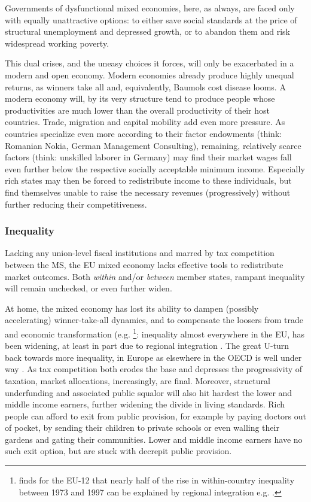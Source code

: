\documentclass[11pt,a4paper,oneside,openright]{article}
\begin{document}
Governments of dysfunctional mixed economies, here, as always, are faced only with equally unattractive options: 
to either save social standards at the price of structural unemployment and depressed growth, or to abandon them and risk widespread working poverty.

This dual crises, and the uneasy choices it forces, will only be exacerbated in a modern and open economy. 
Modern economies already produce highly unequal returns, as winners take all and, equivalently, Baumols cost disease looms. 
A modern economy will, by its very structure tend to produce people whose productivities are much lower than the overall productivity of their host countries. 
Trade, migration and capital mobility add even more pressure. 
As countries specialize even more according to their factor endowments (think: Romanian Nokia, German Management Consulting), remaining, relatively scarce factors (think: unskilled laborer in Germany) may find their market wages fall even further below the respective socially acceptable minimum income. 
Especially rich states may then be forced to redistribute income to these individuals, but find themselves unable to raise the necessary revenues (progressively) without further reducing their competitiveness. 


\subsubsection{Inequality} Lacking any union-level fiscal institutions and marred by tax competition between the \gls{MS}, the \gls{EU} mixed economy lacks effective tools to redistribute market outcomes. 
Both \emph{within} and/or \emph{between} member states, rampant inequality will remain unchecked, or even further widen.

At home, the mixed economy has lost its ability to dampen (possibly accelerating) winner-take-all dynamics, and to compensate the loosers from trade and economic transformation (e.g. \citealt{Beckfield2006}
	\footnote{
		\citeauthor{Beckfield2006} finds for the \gls{EU}-12 that nearly half of the rise in within-country inequality between 1973 and 1997 can be explained by regional integration e.g. \citeyearpar[979]{Beckfield2006}.
	}: 
inequality almost everywhere in the \gls{EU}, has been widening, at least in part due to regional integration \citep[e.g.][265]{DaudUngl2008}. 
The great U-turn back towards more inequality, in Europe as elsewhere in the \gls{OECD} is well under way \citep{AldersonNielsen-2002-aa}. 
As tax competition both erodes the base and depresses the progressivity of taxation, market allocations, increasingly, are final. 
Moreover, structural underfunding and associated public squalor will also hit hardest the lower and middle income earners, further widening the divide in living standards. 
Rich people can afford to exit from public provision, for example by paying doctors out of pocket, by sending their children to private schools or even walling their gardens and gating their communities. 
Lower and middle income earners have no such exit option, but are stuck with decrepit public provision.
\end{document}
